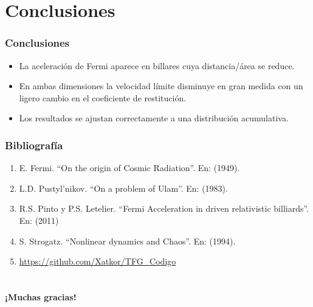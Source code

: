 \documentclass{beamer}
\begin{document}

\section{Conclusiones}

\begin{frame}
    \frametitle[prueb1]{Conclusiones}
    \begin{itemize}
        \item La aceleración de Fermi aparece en billares cuya distancia/área se reduce.
        \item En ambas dimensiones la velocidad límite disminuye en gran medida con un ligero cambio en el coeficiente de restitución.
        \item Los resultados se ajustan correctamente a una distribución acumulativa.
    \end{itemize}
\end{frame}



\begin{frame}
    \frametitle[prueb1]{Bibliografía}
    \begin{enumerate}[topsep=0pt,itemsep=4pt,partopsep=1ex,parsep=1ex]
        \item E. Fermi. “On the origin of Cosmic Radiation”. En: (1949).
        \item L.D. Pustyl’nikov. “On a problem of Ulam”. En: (1983).
        \item R.S. Pinto y P.S. Letelier. “Fermi Acceleration in driven relativistic billiards”. En: (2011)
        \item S. Strogatz. “Nonlinear dynamics and Chaos”. En: (1994).
        \item \url{https://github.com/Xatkor/TFG_Codigo}
    \end{enumerate}
\end{frame}


\section{} 

\begin{frame}
    \titlepage%
    \centering
    \Large\textbf{¡Muchas gracias!}
\end{frame}
\end{document}
